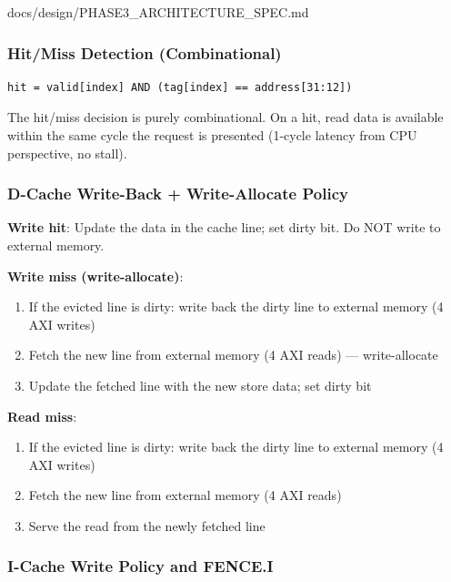 \begin{relocated}{docs/design/PHASE3_ARCHITECTURE_SPEC.md}
\subsubsection{Hit/Miss Detection (Combinational)}\label{ds:ch:phase3-architecture:24-hitmiss-detection-combinational}

\begin{lstlisting}[language={}]
hit = valid[index] AND (tag[index] == address[31:12])
\end{lstlisting}

The hit/miss decision is purely combinational. On a hit, read data is
available within the same cycle the request is presented (1-cycle
latency from CPU perspective, no stall).

\subsubsection{D-Cache Write-Back + Write-Allocate Policy}\label{ds:ch:phase3-architecture:25-d-cache-write-back-write-allocate-policy}

\textbf{Write hit}: Update the data in the cache line; set dirty bit. Do
NOT write to external memory.

\textbf{Write miss (write-allocate)}:

\begin{enumerate}
\def\labelenumi{\arabic{enumi}.}
\tightlist
\item
  If the evicted line is dirty: write back the dirty line to external
  memory (4 AXI writes)
\item
  Fetch the new line from external memory (4 AXI reads) ---
  write-allocate
\item
  Update the fetched line with the new store data; set dirty bit
\end{enumerate}

\textbf{Read miss}:

\begin{enumerate}
\def\labelenumi{\arabic{enumi}.}
\tightlist
\item
  If the evicted line is dirty: write back the dirty line to external
  memory (4 AXI writes)
\item
  Fetch the new line from external memory (4 AXI reads)
\item
  Serve the read from the newly fetched line
\end{enumerate}

\subsubsection{I-Cache Write Policy and FENCE.I}\label{ds:ch:phase3-architecture:26-i-cache-write-policy-and-fencei}


\end{relocated}
